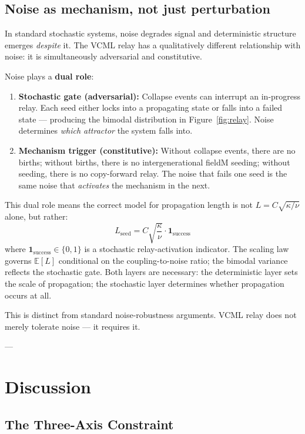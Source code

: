 \documentclass[11pt]{article}
\begin{document}
\subsection{Noise as mechanism, not just perturbation}

In standard stochastic systems, noise degrades signal and deterministic structure emerges \emph{despite} it. The VCML relay has a qualitatively different relationship with noise: it is simultaneously adversarial and constitutive.

Noise plays a \textbf{dual role}:
\begin{enumerate}
  \item \textbf{Stochastic gate (adversarial):} Collapse events can interrupt an in-progress relay. Each seed either locks into a propagating state or falls into a failed state --- producing the bimodal distribution in Figure~\ref{fig:relay}. Noise determines \emph{which attractor} the system falls into.
  \item \textbf{Mechanism trigger (constitutive):} Without collapse events, there are no births; without births, there is no intergenerational fieldM seeding; without seeding, there is no copy-forward relay. The noise that fails one seed is the same noise that \emph{activates} the mechanism in the next.
\end{enumerate}

This dual role means the correct model for propagation length is not $L = C\sqrt{\kappa/\nu}$ alone, but rather:
\[
  L_{\text{seed}} = C\sqrt{\frac{\kappa}{\nu}} \cdot \mathbf{1}_{\text{success}}
\]
where $\mathbf{1}_{\text{success}} \in \{0, 1\}$ is a stochastic relay-activation indicator. The scaling law governs $\mathbb{E}[L]$ conditional on the coupling-to-noise ratio; the bimodal variance reflects the stochastic gate. Both layers are necessary: the deterministic layer sets the scale of propagation; the stochastic layer determines whether propagation occurs at all.

This is distinct from standard noise-robustness arguments. VCML relay does not merely tolerate noise --- it requires it.

---

\section{Discussion}

\subsection{The Three-Axis Constraint}
\end{document}
